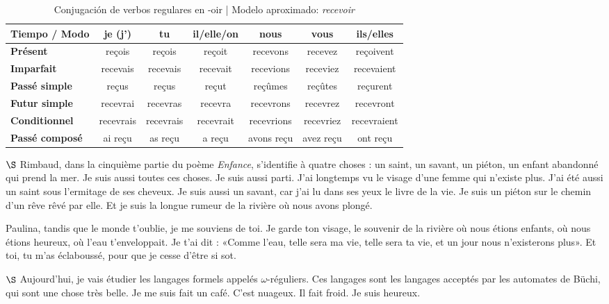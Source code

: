 \documentclass[a4paper, 12pt]{article}
\begin{document}
\begin{table}[htbp]
\centering
\caption{Conjugación de verbos regulares en -oir | Modelo aproximado: \textit{recevoir}}
\vspace{0.2cm}
\begin{tabular}{lcccccc}
\toprule
\textbf{Tiempo / Modo} & \textbf{je (j')} & \textbf{tu} & \textbf{il/elle/on} & \textbf{nous} & \textbf{vous} & \textbf{ils/elles} \\
\midrule
\textbf{Présent} & reçois & reçois & reçoit & recevons & recevez & reçoivent \\
\textbf{Imparfait} & recevais & recevais & recevait & recevions & receviez & recevaient \\
\textbf{Passé simple} & reçus & reçus & reçut & reçûmes & reçûtes & reçurent \\
\textbf{Futur simple} & recevrai & recevras & recevra & recevrons & recevrez & recevront \\
\textbf{Conditionnel} & recevrais & recevrais & recevrait & recevrions & recevriez & recevraient \\
\textbf{Passé composé} & ai reçu & as reçu & a reçu & avons reçu & avez reçu & ont reçu \\
\bottomrule
\end{tabular}
\end{table}

\pagebreak

$\S$ Rimbaud, dans la cinquième partie du poème \textit{Enfance}, s'identifie à
quatre choses : un saint, un savant, un piéton, un enfant abandonné qui prend la
mer. Je suis aussi toutes ces choses. Je suis aussi parti. J'ai longtemps vu le
visage d'une femme qui n'existe plus. J'ai été aussi un saint sous l'ermitage de
ses cheveux. Je suis aussi un savant, car j'ai lu dans ses yeux le livre de la
vie. Je suis un piéton sur le chemin d'un rêve rêvé par elle. Et je suis la
longue rumeur de la rivière où nous avons plongé.

Paulina, tandis que le monde t'oublie, je me souviens de toi. Je garde ton
visage, le souvenir de la rivière où nous étions enfants, où nous étions
heureux, où l'eau t'enveloppait. Je t'ai dit : «Comme l'eau, telle sera ma vie,
telle sera ta vie, et un jour nous n'existerons plus». Et toi, tu m'as
éclaboussé, pour que je cesse d'être si sot.
~

$\S$ Aujourd'hui, je vais étudier les langages formels appelés
$\omega$-réguliers. Ces langages sont les langages acceptés par les automates de
Büchi, qui sont une chose très belle. Je me suis fait un café. C'est nuageux. Il
fait froid. Je suis heureux.
\end{document}
